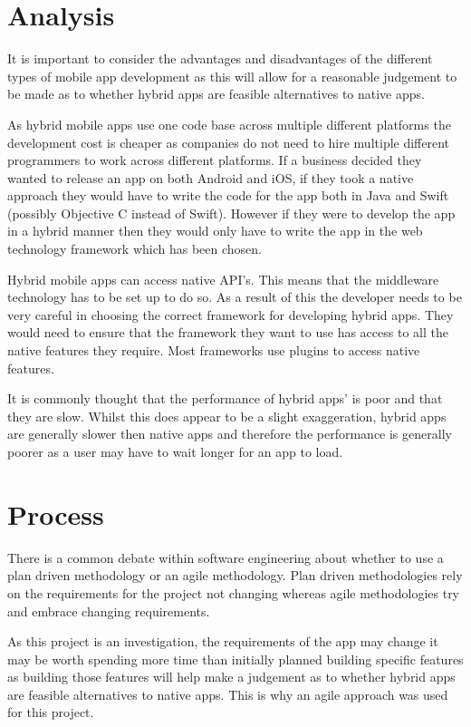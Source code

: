 \section{Analysis}
It is important to consider the advantages and disadvantages of the different types of mobile app development as this will allow for a reasonable judgement to be made as to whether hybrid apps are feasible alternatives to native apps.

As hybrid mobile apps use one code base across multiple different platforms the development cost is cheaper as companies do not need to hire multiple different programmers to work across different platforms. If a business decided they wanted to release an app on both Android and iOS, if they took a native approach they would have to write the code for the app both in Java and Swift (possibly Objective C instead of Swift). However if they were to develop the app in a hybrid manner then they would only have to write the app in the web technology framework which has been chosen.

Hybrid mobile apps can access native API's. This means that the middleware technology has to be set up to do so. As a result of this the developer needs to be very careful in choosing the correct framework for developing hybrid apps. They would need to ensure that the framework they want to use has access to all the native features they require. Most frameworks use plugins to access native features.

It is commonly thought that the performance of hybrid apps' is poor and that they are slow. Whilst this does appear to be a slight exaggeration, hybrid apps are generally slower then native apps and therefore the performance is generally poorer as a user may have to wait longer for an app to load.


\section{Process}
There is a common debate within software engineering about whether to use a plan driven methodology or an agile methodology. Plan driven methodologies rely on the requirements for the project not changing whereas agile methodologies try and embrace changing requirements.

As this project is an investigation, the requirements of the app may change it may be worth spending more time than initially planned building specific features as building those features will help make a judgement as to whether hybrid apps are feasible alternatives to native apps. This is why an agile approach was used for this project.

